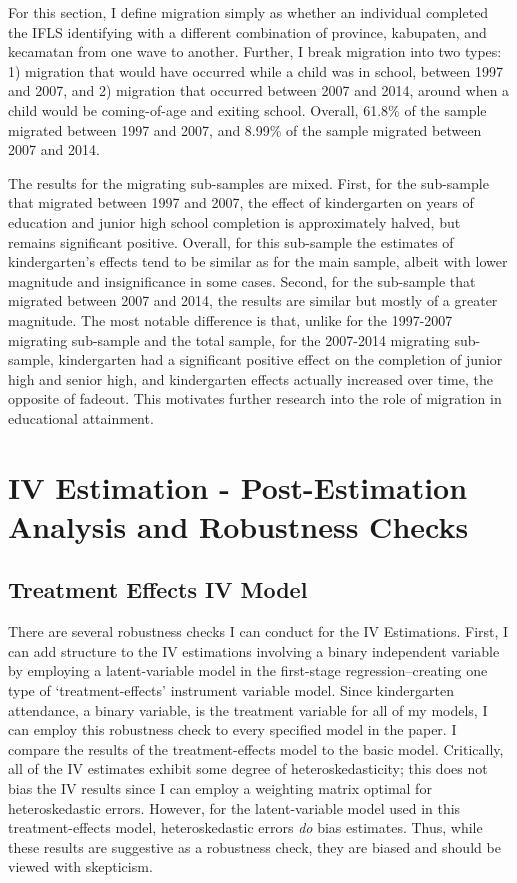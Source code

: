 For this section, I define migration simply as whether an individual completed the IFLS identifying with a different combination of province, kabupaten, and kecamatan from one wave to another. Further, I break migration into two types: 1) migration that would have occurred while a child was in school, between 1997 and 2007, and 2) migration that occurred between 2007 and 2014, around when a child would be coming-of-age and exiting school. Overall, 61.8\% of the sample migrated between 1997 and 2007, and 8.99\% of the sample migrated between 2007 and 2014.

The results for the migrating sub-samples are mixed. First, for the sub-sample that migrated between 1997 and 2007, the effect of kindergarten on years of education and junior high school completion is approximately halved, but remains significant positive. Overall, for this sub-sample the estimates of kindergarten's effects tend to be similar as for the main sample, albeit with lower magnitude and insignificance in some cases. Second, for the sub-sample that migrated between 2007 and 2014, the results are similar but mostly of a greater magnitude. The most notable difference is that, unlike for the 1997-2007 migrating sub-sample and the total sample, for the 2007-2014 migrating sub-sample, kindergarten had a significant positive effect on the completion of junior high and senior high, and kindergarten effects actually increased over time, the opposite of fadeout. This motivates further research into the role of migration in educational attainment.

\section{IV Estimation - Post-Estimation Analysis and Robustness Checks}
	\label{app:iv_robust}
	\subsection{Treatment Effects IV Model}
There are several robustness checks I can conduct for the IV Estimations. First, I can add structure to the IV estimations involving a binary independent variable by employing a latent-variable model in the first-stage regression--creating one type of `treatment-effects' instrument variable model. Since kindergarten attendance, a binary variable, is the treatment variable for all of my models, I can employ this robustness check to every specified model in the paper. I compare the results of the treatment-effects model to the basic model. Critically, all of the IV estimates exhibit some degree of heteroskedasticity; this does not bias the IV results since I can employ a weighting matrix optimal for heteroskedastic errors. However, for the latent-variable model used in this treatment-effects model, heteroskedastic errors \textit{do} bias estimates. Thus, while these results are suggestive as a robustness check, they are biased and should be viewed with skepticism.

